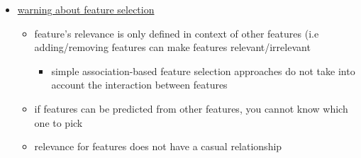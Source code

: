 \documentclass[10.5pt,a4paper, fleqn, dvipsnames]{article}
\begin{document}
\begin{itemize}
\begin{itemize}
    \end{itemize}
    \item \ul{warning about feature selection}
    \begin{itemize}
        \item feature's relevance is only defined in context of other features (i.e adding/removing features can make features relevant/irrelevant 
        \begin{itemize}[leftmargin = 2em]
            \item simple association-based feature selection approaches do not take into account the interaction between features
        \end{itemize}
        \item if features can be predicted from other features, you cannot know which one to pick 
        \item relevance for features does not have a casual relationship 
    \end{itemize}
\end{itemize}
\end{document}
